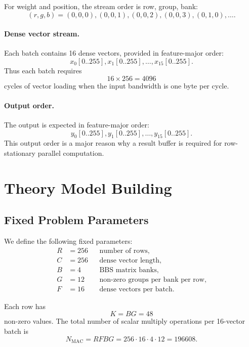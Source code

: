 \documentclass[11pt,a4paper]{article}
\begin{document}
For weight and position, the stream order is row, group, bank:
\begin{equation}
    (r,g,b) = (0,0,0), (0,0,1), (0,0,2), (0,0,3), (0,1,0), \ldots.
\end{equation}

\paragraph{Dense vector stream.}
Each batch contains 16 dense vectors, provided in feature-major order:
\begin{equation}
    x_0[0..255], x_1[0..255], \ldots, x_{15}[0..255].
\end{equation}
Thus each batch requires
\begin{equation}
    16 \times 256 = 4096
\end{equation}
cycles of vector loading when the input bandwidth is one byte per cycle.

\paragraph{Output order.}
The output is expected in feature-major order:
\begin{equation}
    y_0[0..255], y_1[0..255], \ldots, y_{15}[0..255].
\end{equation}
This output order is a major reason why a result buffer is required for row-stationary parallel computation.

\section{Theory Model Building}

\subsection{Fixed Problem Parameters}

We define the following fixed parameters:
\begin{align*}
    R &= 256 && \text{number of rows},\\
    C &= 256 && \text{dense vector length},\\
    B &= 4   && \text{BBS matrix banks},\\
    G &= 12  && \text{non-zero groups per bank per row},\\
    F &= 16  && \text{dense vectors per batch}.
\end{align*}

Each row has
\begin{equation}
    K = B G = 48
\end{equation}
non-zero values. The total number of scalar multiply operations per 16-vector batch is
\begin{equation}
    N_{\mathrm{MAC}} = R F B G = 256 \cdot 16 \cdot 4 \cdot 12 = 196608.
\end{equation}
\end{document}
